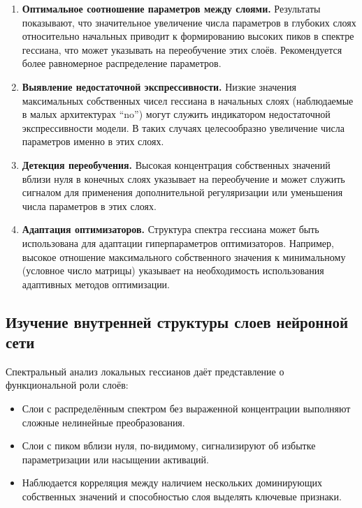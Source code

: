 \documentclass[a4paper,12pt]{article}
\begin{document}
\begin{enumerate}
  \item \textbf{Оптимальное соотношение параметров между слоями.} Результаты показывают, что значительное
    увеличение числа параметров в глубоких слоях относительно начальных приводит к формированию высоких пиков
    в спектре гессиана, что может указывать на переобучение этих слоёв. Рекомендуется более равномерное
    распределение параметров.

  \item \textbf{Выявление недостаточной экспрессивности.} Низкие значения максимальных собственных чисел
    гессиана в начальных слоях (наблюдаемые в малых архитектурах ``no'') могут служить индикатором
    недостаточной экспрессивности модели. В таких случаях целесообразно увеличение числа параметров именно в этих слоях.

  \item \textbf{Детекция переобучения.} Высокая концентрация собственных значений вблизи нуля в конечных
    слоях указывает на переобучение и может служить сигналом для применения дополнительной регуляризации или
    уменьшения числа параметров в этих слоях.

  \item \textbf{Адаптация оптимизаторов.} Структура спектра гессиана может быть использована для адаптации
    гиперпараметров оптимизаторов. Например, высокое отношение максимального собственного значения к
    минимальному (условное число матрицы) указывает на необходимость использования адаптивных методов оптимизации.
\end{enumerate}

\subsection{Изучение внутренней структуры слоев нейронной сети}
Спектральный анализ локальных гессианов даёт представление о функциональной роли слоёв:
\begin{itemize}
  \item Слои с распределённым спектром без выраженной концентрации выполняют сложные нелинейные преобразования.
  \item Слои с пиком вблизи нуля, по-видимому, сигнализируют об избытке параметризации или насыщении активаций.
  \item Наблюдается корреляция между наличием нескольких доминирующих собственных значений и способностью
    слоя выделять ключевые признаки.
\end{itemize}
\end{document}
